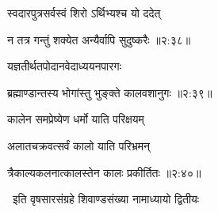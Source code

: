 {\devanagarifont स्वदारपुत्रसर्वस्वं शिरो ऽर्थिभ्यश्च यो ददेत्  \danda\dontdisplaylinenum }%


{\devanagarifont न तत्र गन्तुं शक्येत अन्यैर्वापि सुदुष्करैः {॥२:३८॥} \veg\dontdisplaylinenum }%

{\devanagarifont यज्ञतीर्थतपोदानवेदाध्ययनपारगः \thinspace{\dandab} \dontdisplaylinenum }%


{\devanagarifont ब्रह्माण्डान्तस्य भोगांस्तु भुङ्क्ते कालवशानुगः {॥२:३९॥} \veg\dontdisplaylinenum }%

{\devanagarifont कालेन समप्रेष्येण धर्मो याति परिक्षयम् \thinspace{\dandab} \dontdisplaylinenum }%

{\devanagarifont अलातचक्रवत्सर्वं कालो याति परिभ्रमन्  \danda\dontdisplaylinenum }%
 

{\devanagarifont त्रैकाल्यकलनात्कालस्तेन कालः प्रकीर्तितः {॥२:४०॥} \veg\dontdisplaylinenum }%

{\devanagarifont 
\jump
\begin{center}
\ketdanda\ इति वृषसारसंग्रहे शिवाण्डसंख्या नामाध्यायो द्वितीयः\ketdanda
\end{center}
\dontdisplaylinenum\vers  }%
\bekveg\szamveg
\vfill
\phpspagebreak

